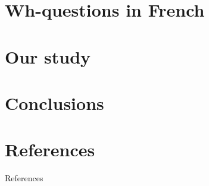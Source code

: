 \documentclass[aspectratio=169, sectionpages, codemintedoverleaf, bibref]{beamer}
\begin{document}
\section{Wh-questions in French}




\section{Our study}





\section{Conclusions}


\section{References}

\begin{frame}[allowframebreaks]{References}

\printbibliography

\end{frame}
\end{document}
